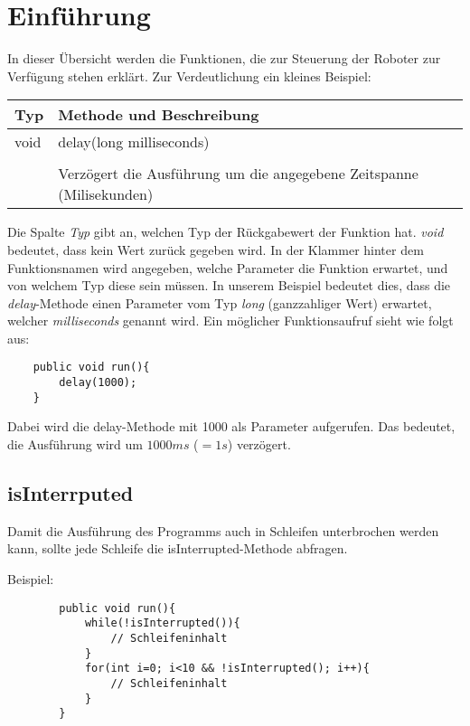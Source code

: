 	
	
	\section{Einführung}
	In dieser Übersicht werden die Funktionen, die zur Steuerung der Roboter zur Verfügung stehen erklärt.
	Zur Verdeutlichung ein kleines Beispiel:
	
		\begin{table}[htbp]
		\begin{tabular}{|p{} p{}|}
			\hline
			\textbf{Typ} & \textbf{Methode und Beschreibung} \\ \hline
			void & delay(long milliseconds) \\ 
			&\\
			& Verzögert die Ausführung um die angegebene Zeitspanne (Milisekunden)\\ \hline
		\end{tabular}
		\end{table}
	
	Die Spalte \textit{Typ }gibt an, welchen Typ der Rückgabewert der Funktion hat. \textit{void} bedeutet, dass kein Wert zurück gegeben wird. 
	In der Klammer hinter dem Funktionsnamen wird angegeben, welche Parameter die Funktion erwartet, und von welchem Typ diese sein müssen. In unserem Beispiel bedeutet dies, dass die \textit{delay}-Methode einen Parameter vom Typ \textit{long} (ganzzahliger Wert) erwartet, welcher \textit{milliseconds }genannt wird. 
	Ein möglicher Funktionsaufruf sieht wie folgt aus:
	
	\begin{lstlisting}
	public void run(){	
		delay(1000);
	}
	\end{lstlisting}
	
	Dabei wird die delay-Methode mit 1000 als Parameter aufgerufen. Das bedeutet, die Ausführung wird um $1000ms$ ($= 1s$) verzögert.
	
	
	\subsection{isInterrputed}
	Damit die Ausführung des Programms auch in Schleifen unterbrochen werden kann, sollte jede Schleife die isInterrupted-Methode abfragen. 
	
	Beispiel:
	\begin{lstlisting}
		public void run(){	
			while(!isInterrupted()){
				// Schleifeninhalt
			}
			for(int i=0; i<10 && !isInterrupted(); i++){
				// Schleifeninhalt
			}
		}
	\end{lstlisting}
	
